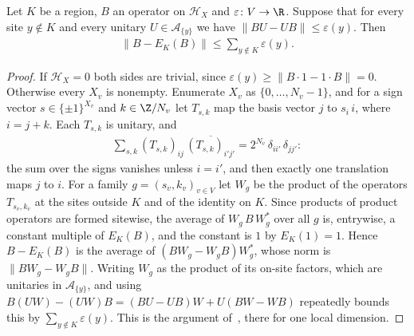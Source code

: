 \begin{theorem}
    \label{thm:sites_region_expectation_localization}
    \leanok
    Let $K$ be a region, $B$ an operator on $\mathcal H_X$ and $\varepsilon\colon
    V\to\R$. Suppose that for every site $y\notin K$ and every unitary
    $U\in\mathcal A_{\{y\}}$ we have $\lVert BU-UB\rVert\leq\varepsilon(y)$.
    Then
    \begin{align*}
        \lVert B-E_K(B)\rVert\leq\sum_{y\notin K}\varepsilon(y).
    \end{align*}
\end{theorem}
\begin{proof}\leanok
    If $\mathcal H_X=0$ both sides are trivial, since $\varepsilon(y)\geq
    \lVert B\cdot1-1\cdot B\rVert=0$. Otherwise every $X_v$ is nonempty.
    Enumerate $X_v$ as $\{0,\dots,N_v-1\}$, and for a sign vector
    $s\in\{\pm1\}^{X_v}$ and $k\in\Z/N_v$ let $T_{s,k}$ map the basis vector
    $j$ to $s_i\,i$, where $i=j+k$. Each $T_{s,k}$ is unitary, and
    \begin{align*}
        \sum_{s,k}(T_{s,k})_{ij}\,\overline{(T_{s,k})_{i'j'}}
            =2^{N_v}\,\delta_{ii'}\,\delta_{jj'}:
    \end{align*}
    the sum over the signs vanishes unless $i=i'$, and then exactly one
    translation maps $j$ to $i$. For a family $g=(s_v,k_v)_{v\in V}$ let
    $W_g$ be the product of the operators $T_{s_v,k_v}$ at the sites outside
    $K$ and of the identity on $K$. Since products of product operators are
    formed sitewise, the average of $W_g\,B\,W_g^*$ over all $g$ is, entrywise,
    a constant multiple of $E_K(B)$, and the constant is $1$ by $E_K(1)=1$.
    Hence $B-E_K(B)$ is the average of $(BW_g-W_gB)W_g^*$, whose norm is
    $\lVert BW_g-W_gB\rVert$. Writing $W_g$ as the product of its on-site
    factors, which are unitaries in $\mathcal A_{\{y\}}$, and using
    $B(UW)-(UW)B=(BU-UB)W+U(BW-WB)$ repeatedly bounds this by
    $\sum_{y\notin K}\varepsilon(y)$. This is the argument
    of~\cite[proof of Lemma~4.1]{OpenAI2026AreaLaw}, there for one local
    dimension.
\end{proof}

